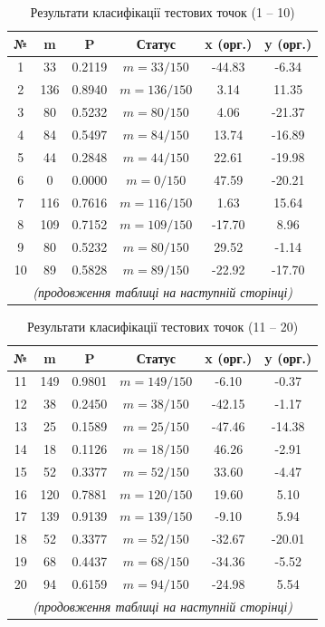 \documentclass[12pt,a4paper]{article}
\begin{document}
\begin{table}[H]
\centering
\small
\begin{tabular}{|c|c|c|c|c|c|}
\toprule
\textbf{№} & \textbf{m} & \textbf{P} & \textbf{Статус} & \textbf{x (орг.)} & \textbf{y (орг.)} \\
\midrule
1 & 33 & 0.2119 & $m=33/150$ & -44.83 & -6.34 \\
2 & 136 & 0.8940 & $m=136/150$ & 3.14 & 11.35 \\
3 & 80 & 0.5232 & $m=80/150$ & 4.06 & -21.37 \\
4 & 84 & 0.5497 & $m=84/150$ & 13.74 & -16.89 \\
5 & 44 & 0.2848 & $m=44/150$ & 22.61 & -19.98 \\
6 & 0 & 0.0000 & $m=0/150$ & 47.59 & -20.21 \\
7 & 116 & 0.7616 & $m=116/150$ & 1.63 & 15.64 \\
8 & 109 & 0.7152 & $m=109/150$ & -17.70 & 8.96 \\
9 & 80 & 0.5232 & $m=80/150$ & 29.52 & -1.14 \\
10 & 89 & 0.5828 & $m=89/150$ & -22.92 & -17.70 \\
\midrule
\multicolumn{6}{c}{\textit{(продовження таблиці на наступній сторінці)}} \\
\bottomrule
\end{tabular}
\caption{Результати класифікації тестових точок (1 -- 10)}
\end{table}

\begin{table}[H]
\centering
\small
\begin{tabular}{|c|c|c|c|c|c|}
\toprule
\textbf{№} & \textbf{m} & \textbf{P} & \textbf{Статус} & \textbf{x (орг.)} & \textbf{y (орг.)} \\
\midrule
11 & 149 & 0.9801 & $m=149/150$ & -6.10 & -0.37 \\
12 & 38 & 0.2450 & $m=38/150$ & -42.15 & -1.17 \\
13 & 25 & 0.1589 & $m=25/150$ & -47.46 & -14.38 \\
14 & 18 & 0.1126 & $m=18/150$ & 46.26 & -2.91 \\
15 & 52 & 0.3377 & $m=52/150$ & 33.60 & -4.47 \\
16 & 120 & 0.7881 & $m=120/150$ & 19.60 & 5.10 \\
17 & 139 & 0.9139 & $m=139/150$ & -9.10 & 5.94 \\
18 & 52 & 0.3377 & $m=52/150$ & -32.67 & -20.01 \\
19 & 68 & 0.4437 & $m=68/150$ & -34.36 & -5.52 \\
20 & 94 & 0.6159 & $m=94/150$ & -24.98 & 5.54 \\
\midrule
\multicolumn{6}{c}{\textit{(продовження таблиці на наступній сторінці)}} \\
\bottomrule
\end{tabular}
\caption{Результати класифікації тестових точок (11 -- 20)}
\end{table}
\end{document}
